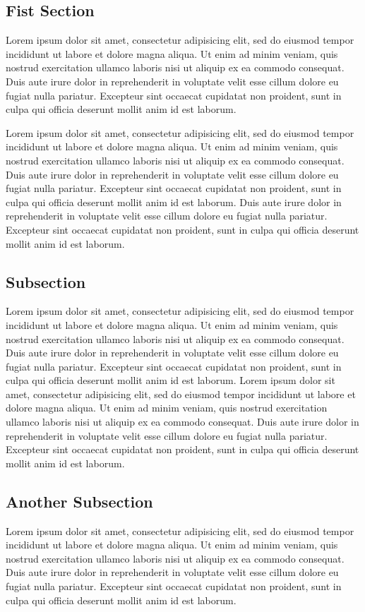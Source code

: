 \documentclass[a4paper, 10pt, twoside, dvipsnames]{article}
\begin{document}
\begin{multicols}{2}

\section{Fist Section}
Lorem ipsum dolor sit amet, consectetur adipisicing elit, sed do eiusmod tempor incididunt ut labore et dolore magna aliqua. Ut enim ad minim veniam, quis nostrud exercitation ullamco laboris nisi ut aliquip ex ea commodo consequat. Duis aute irure dolor in reprehenderit in voluptate velit esse cillum dolore eu fugiat nulla pariatur. Excepteur sint occaecat cupidatat non proident, sunt in culpa qui officia deserunt mollit anim id est laborum. 

Lorem ipsum dolor sit amet, consectetur adipisicing elit, sed do eiusmod tempor incididunt ut labore et dolore magna aliqua. Ut enim ad minim veniam, quis nostrud exercitation ullamco laboris nisi ut aliquip ex ea commodo consequat. Duis aute irure dolor in reprehenderit in voluptate velit esse cillum dolore eu fugiat nulla pariatur. Excepteur sint occaecat cupidatat non proident, sunt in culpa qui officia deserunt mollit anim id est laborum. Duis aute irure dolor in reprehenderit in voluptate velit esse cillum dolore eu fugiat nulla pariatur. Excepteur sint occaecat cupidatat non proident, sunt in culpa qui officia deserunt mollit anim id est laborum. 

\subsection{Subsection}
Lorem ipsum dolor sit amet, consectetur adipisicing elit, sed do eiusmod tempor incididunt ut labore et dolore magna aliqua. Ut enim ad minim veniam, quis nostrud exercitation ullamco laboris nisi ut aliquip ex ea commodo consequat. Duis aute irure dolor in reprehenderit in voluptate velit esse cillum dolore eu fugiat nulla pariatur. Excepteur sint occaecat cupidatat non proident, sunt in culpa qui officia deserunt mollit anim id est laborum. Lorem ipsum dolor sit amet, consectetur adipisicing elit, sed do eiusmod tempor incididunt ut labore et dolore magna aliqua. Ut enim ad minim veniam, quis nostrud exercitation ullamco laboris nisi ut aliquip ex ea commodo consequat. Duis aute irure dolor in reprehenderit in voluptate velit esse cillum dolore eu fugiat nulla pariatur. Excepteur sint occaecat cupidatat non proident, sunt in culpa qui officia deserunt mollit anim id est laborum.

\subsection{Another Subsection}
Lorem ipsum dolor sit amet, consectetur adipisicing elit, sed do eiusmod tempor incididunt ut labore et dolore magna aliqua. Ut enim ad minim veniam, quis nostrud exercitation ullamco laboris nisi ut aliquip ex ea commodo consequat. Duis aute irure dolor in reprehenderit in voluptate velit esse cillum dolore eu fugiat nulla pariatur. Excepteur sint occaecat cupidatat non proident, sunt in culpa qui officia deserunt mollit anim id est laborum. 


\end{multicols}
\end{document}

